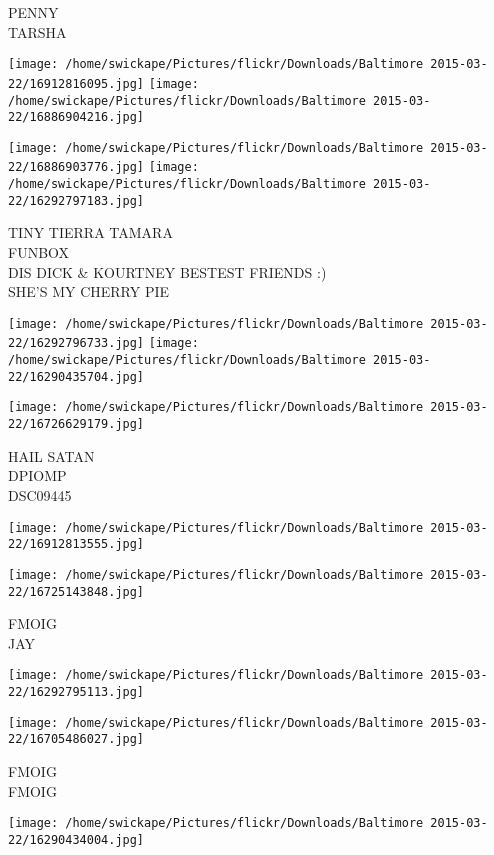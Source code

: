 \documentclass[10pt,letterpaper]{article}
\begin{document}
PENNY\\
TARSHA
\pagebreak

\texttt{[image: /home/swickape/Pictures/flickr/Downloads/Baltimore 2015-03-22/16912816095.jpg]}
\texttt{[image: /home/swickape/Pictures/flickr/Downloads/Baltimore 2015-03-22/16886904216.jpg]}

\texttt{[image: /home/swickape/Pictures/flickr/Downloads/Baltimore 2015-03-22/16886903776.jpg]}
\texttt{[image: /home/swickape/Pictures/flickr/Downloads/Baltimore 2015-03-22/16292797183.jpg]}

TINY TIERRA TAMARA\\
FUNBOX\\
DIS DICK \& KOURTNEY BESTEST FRIENDS :)\\
SHE'S MY CHERRY PIE
\pagebreak

\texttt{[image: /home/swickape/Pictures/flickr/Downloads/Baltimore 2015-03-22/16292796733.jpg]}
\texttt{[image: /home/swickape/Pictures/flickr/Downloads/Baltimore 2015-03-22/16290435704.jpg]}

\vspace{0.25in}
\texttt{[image: /home/swickape/Pictures/flickr/Downloads/Baltimore 2015-03-22/16726629179.jpg]}

HAIL SATAN\\
DPIOMP\\
DSC09445
\pagebreak

\texttt{[image: /home/swickape/Pictures/flickr/Downloads/Baltimore 2015-03-22/16912813555.jpg]}

\vspace{0.25in}
\texttt{[image: /home/swickape/Pictures/flickr/Downloads/Baltimore 2015-03-22/16725143848.jpg]}

FMOIG\\
JAY
\pagebreak

\texttt{[image: /home/swickape/Pictures/flickr/Downloads/Baltimore 2015-03-22/16292795113.jpg]}

\vspace{0.25in}
\texttt{[image: /home/swickape/Pictures/flickr/Downloads/Baltimore 2015-03-22/16705486027.jpg]}

FMOIG\\
FMOIG
\pagebreak

\texttt{[image: /home/swickape/Pictures/flickr/Downloads/Baltimore 2015-03-22/16290434004.jpg]}
\end{document}
